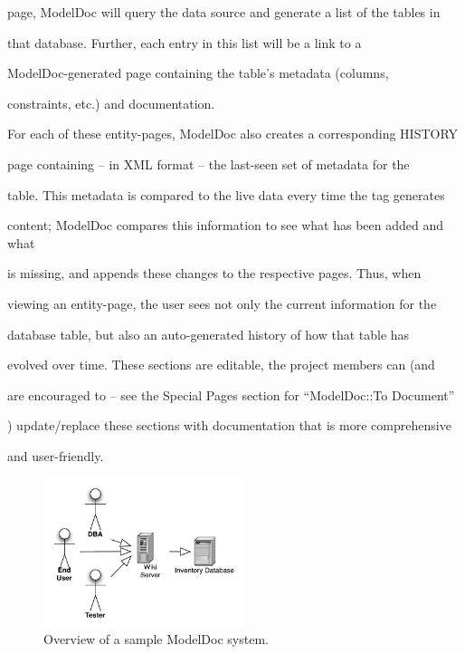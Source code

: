 \documentclass{acm_proc_article-sp}
\begin{document}
page, ModelDoc will query the data source and generate a list of the tables in

that database.  Further, each entry in this list will be a link to a

ModelDoc-generated page containing the table's metadata (columns,

constraints, etc.) and documentation.



For each of these entity-pages, ModelDoc also creates a corresponding HISTORY

page containing -- in XML format -- the last-seen set of metadata for the

table.  This metadata is compared to the live data every time the tag generates

content; ModelDoc compares this information to see what has been added and what

is missing, and appends these changes to the respective pages.  Thus, when

viewing an entity-page, the user sees not only the current information for the

database table, but also an auto-generated history of how that table has

evolved over time.  These sections are editable, the project members can (and

are encouraged to -- see the Special Pages section for ``ModelDoc::To Document''

) update/replace these sections with documentation that is more comprehensive

and user-friendly.



\begin{figure}[b]

\centering


\includegraphics[width=220px]{Overview.pdf}

\caption{Overview of a sample ModelDoc system.}

\end{figure}
\end{document}
